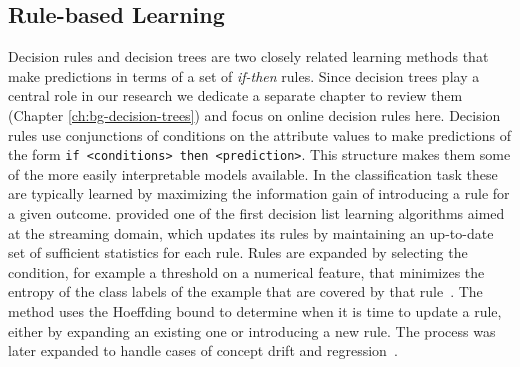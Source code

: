 \subsection*{Rule-based Learning}
Decision rules \cite{decision-lists} and decision trees \cite{breiman1984cart} are two closely related learning methods
that make predictions in terms of a set of \emph{if-then} rules. Since
decision trees play a central role in our research we dedicate a separate
chapter to review them (Chapter \ref{ch:bg-decision-trees}) and focus on
online decision rules here. Decision rules use conjunctions of conditions
on the attribute values to make predictions of the form
\texttt{if <conditions> then <prediction>}. This structure makes them
some of the more easily interpretable models available.
In the classification task
these are typically learned by maximizing the information gain
of introducing a rule for a given outcome.
\citet{decision-rules-streams}
provided one of the first decision list learning algorithms aimed at the streaming
domain, which updates its rules by maintaining an up-to-date set of sufficient statistics for each
rule. Rules are expanded by selecting the condition, for example a threshold on
a numerical feature, that minimizes the entropy of the class labels of the example
that are covered by that rule~\cite{decision-rules-streams}.
The method uses the Hoeffding bound \cite{hoeffding-bound} to determine when it is time
to update a rule, either by expanding an existing one or introducing a new rule.
The process was later expanded to handle cases of concept drift \cite{adaptive-rules-classification}
and regression~\cite{adaptive-rules-regression}.


%
%




